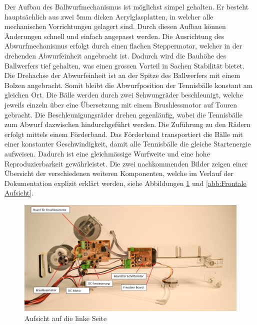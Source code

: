     Der Aufbau des Ballwurfmechanismus ist möglichst simpel gehalten. Er besteht 
    hauptsächlich aus zwei $5\si{\milli\meter}$ dicken Acrylglasplatten, in welcher alle mechanischen 
    Vorrichtungen gelagert sind. Durch diesen Aufbau können Änderungen schnell und 
    einfach angepasst werden. Die Ausrichtung des Abwurfmechanismus erfolgt durch 
    einen flachen Steppermotor, welcher in der drehenden Abwurfeinheit angebracht 
    ist. Dadurch wird die Bauhöhe des Ballwerfers tief gehalten, was einen grossen 
    Vorteil in Sachen Stabilität bietet. Die Drehachse der Abwurfeinheit ist an der Spitze des 
    Ballwerfers mit einem Bolzen angebracht. Somit bleibt die Abwurfposition der 
    Tennisbälle konstant am gleichen Ort. Die Bälle werden durch zwei 
    Schwungräder beschleunigt, welche jeweils einzeln 
    über eine Übersetzung mit einem Brushlessmotor auf Touren gebracht. Die Beschleunigungsräder 
    drehen gegenläufig, wobei die Tennisbälle zum Abwurf dazwischen hindurchgeführt werden. Die Zuführung zu den Rädern erfolgt mittels 
    einem Förderband. Das Förderband transportiert die Bälle mit einer 
    konstanter Geschwindigkeit, damit alle Tennisbälle die 
    gleiche Startenergie aufweisen. Dadurch ist eine gleichmässige Wurfweite und eine 
    hohe Reproduzierbarkeit gewährleistet.
    Die zwei nachkommenden Bilder zeigen einer Übersicht der verschiedenen weiteren Komponenten, welche im Verlauf der Dokumentation explizit erklärt werden, siehe Abbildungen \ref{abb:Aufsicht auf die linke Seite} und \ref{abb:Frontale Aufsicht}.
	
	\begin{figure}[h!]
	   	\includegraphics[width=1\textwidth,clip,trim=8mm 0mm 15mm 0mm]
	   	{Enddokumentation/Bilder/Geraeteuebersicht_1.jpg}
	   	\centering
	   	\caption{Aufsicht auf die linke Seite}
	   	\label{abb:Aufsicht auf die linke Seite}
	\end{figure}
	
